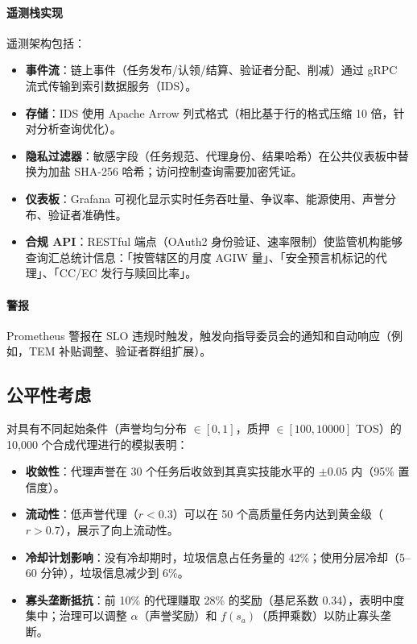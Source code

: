 \documentclass[11pt]{article}
\begin{document}
\paragraph{遥测栈实现} 遥测架构包括：
\begin{itemize}[noitemsep]
  \item \textbf{事件流}：链上事件（任务发布/认领/结算、验证者分配、削减）通过 gRPC 流式传输到索引数据服务（IDS）。
  \item \textbf{存储}：IDS 使用 Apache Arrow 列式格式（相比基于行的格式压缩 10 倍，针对分析查询优化）。
  \item \textbf{隐私过滤器}：敏感字段（任务规范、代理身份、结果哈希）在公共仪表板中替换为加盐 SHA-256 哈希；访问控制查询需要加密凭证。
  \item \textbf{仪表板}：Grafana 可视化显示实时任务吞吐量、争议率、能源使用、声誉分布、验证者准确性。
  \item \textbf{合规 API}：RESTful 端点（OAuth2 身份验证、速率限制）使监管机构能够查询汇总统计信息：「按管辖区的月度 AGIW 量」、「安全预言机标记的代理」、「CC/EC 发行与赎回比率」。
\end{itemize}

\paragraph{警报} Prometheus 警报在 SLO 违规时触发，触发向指导委员会的通知和自动响应（例如，TEM 补贴调整、验证者群组扩展）。

\subsection{公平性考虑}
对具有不同起始条件（声誉均匀分布 $\in [0,1]$，质押 $\in [100, 10000]$ TOS）的 10,000 个合成代理进行的模拟表明：
\begin{itemize}[noitemsep]
  \item \textbf{收敛性}：代理声誉在 30 个任务后收敛到其真实技能水平的 $\pm0.05$ 内（95\% 置信度）。
  \item \textbf{流动性}：低声誉代理（$r<0.3$）可以在 50 个高质量任务内达到黄金级（$r>0.7$），展示了向上流动性。
  \item \textbf{冷却计划影响}：没有冷却期时，垃圾信息占任务量的 42\%；使用分层冷却（5--60 分钟），垃圾信息减少到 6\%。
  \item \textbf{寡头垄断抵抗}：前 10\% 的代理赚取 28\% 的奖励（基尼系数 0.34），表明中度集中；治理可以调整 $\alpha$（声誉奖励）和 $f(s_a)$（质押乘数）以防止寡头垄断。
\end{itemize}
\end{document}
